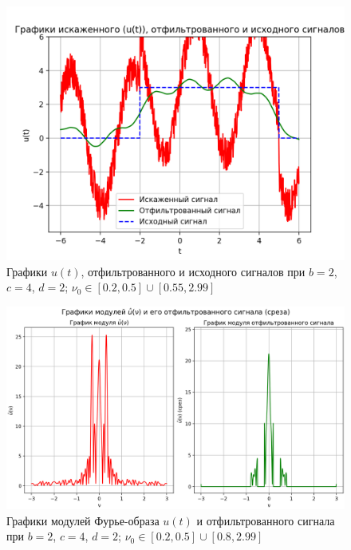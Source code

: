 \begin{figure}[ht!]
    \centering
    \includegraphics[scale=0.65]{media/1 task/specific_freq/Cleaned_2_4_2_-0,5_-0,2_-2,99_-0,55.png}
    \caption{Графики  $u(t)$, отфильтрованного и исходного сигналов при $b=2$, $c=4$, $d=2$; $\nu_0 \in [0.2, 0.5] \cup [0.55, 2.99]$}
    \label{fig:cleaned_2_4_2_3}
\end{figure}

\begin{figure}[ht!]
    \centering
    \includegraphics[scale=0.55]{media/1 task/specific_freq/Fourier_Image_2_4_2_-0,5_-0,2_-2,99_-0,8.png}
    \caption{Графики модулей Фурье-образа $u(t)$ и отфильтрованного сигнала при $b=2$, $c=4$, $d=2$; $\nu_0 \in [0.2, 0.5] \cup [0.8, 2.99]$}
    \label{fig:four_2_4_2_1}
\end{figure}

